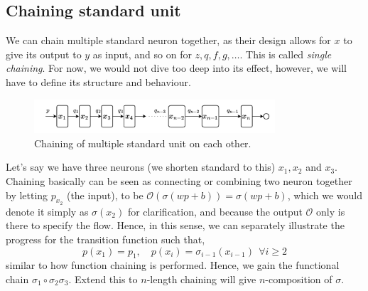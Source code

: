 \subsection{Chaining standard unit}
We can chain multiple standard neuron together, as their design allows for $x$ to give its output to $y$ as input, and so on for $z,q,f,g,\dots$. This is called \textit{single chaining}. For now, we would not dive too deep into its effect, however, we will have to define its structure and behaviour. 
\begin{figure}[htb]
    \centering
    \includegraphics[width=0.8\textwidth]{img/chaining1.png}
    \caption{Chaining of multiple standard unit on each other.}
    \label{fig:chaining_1_c5}
\end{figure}
Let's say we have three neurons (we shorten standard to this) $x_{1},x_{2}$ and $x_{3}$. Chaining basically can be seen as connecting or combining two neuron together by letting $p_{x_{2}}$ (the input), to be $\mathcal{O}(\sigma(wp+b))=\sigma(wp+b)$, which we would denote it simply as $\sigma(x_{2})$ for clarification, and because the output $\mathcal{O}$ only is there to specify the flow. Hence, in this sense, we can separately illustrate the progress for the transition function such that,
\begin{equation}
    p(x_{1}) = p_{1}, \quad p(x_{i}) = \sigma_{i-1}(x_{i-1}) \: \: \forall i \geq 2
\end{equation}
similar to how function chaining is performed. Hence, we gain the functional chain $\sigma_{1}\circ \sigma_{2}\sigma_{3}$. Extend this to $n$-length chaining will give $n$-composition of $\sigma$. 

